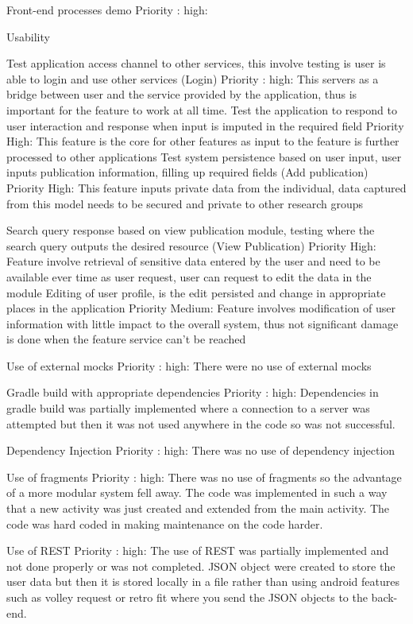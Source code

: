 Front-end processes demo
Priority :{ high}: 


Usability

Test application access channel to other services, this involve testing is user is able to login and use other services (Login)
Priority :{ high}: This servers as a bridge between user and the service provided by the application, thus is important for the feature to work at all time. 
Test the application to respond to user interaction and response when input is imputed in the required field
Priority {High}: This feature is the core for other features as input to the feature is further processed to other applications 
Test system persistence based on user input, user inputs publication information, filling up required fields (Add publication)
Priority {High}: This feature inputs private data from the individual, data captured from this model needs to be secured and private to other research groups  

Search query response based on view publication module, testing where the search query outputs the desired resource (View Publication) 
Priority {High}: Feature involve retrieval of sensitive data entered by the user and need to be available ever time as user request, user can request to edit the data in the module
Editing of user profile, is the edit persisted and change in appropriate places in the application 
Priority {Medium}: Feature involves modification of user information with little impact to the overall system, thus not significant damage is done when the feature service can’t be reached 





Use of external mocks
Priority :{ high}: There were no use of external mocks

Gradle build with appropriate dependencies
Priority :{ high}: Dependencies in gradle build was partially implemented where a connection to a server was attempted but then it was not used anywhere in the code so was not successful.

Dependency Injection
Priority :{ high}: There was no use of dependency injection 

Use of fragments
Priority :{ high}: There was no use of fragments so the advantage of a more modular system fell away. The code was implemented in such a way that a new activity was just created and extended from the main activity. The code was hard coded in making maintenance on the code harder. 

Use of REST
Priority :{ high}: The use of REST was partially implemented and not done properly or was not completed. JSON object were created to store the user data but then it is stored locally in a file rather than using android features such as volley request or retro fit where you send the JSON objects to the back-end.